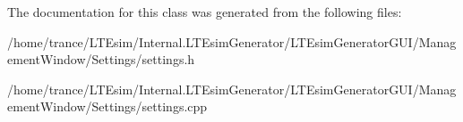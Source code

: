 The documentation for this class was generated from the following files\+:\begin{DoxyCompactItemize}
\item 
/home/trance/\+L\+T\+Esim/\+Internal.\+L\+T\+Esim\+Generator/\+L\+T\+Esim\+Generator\+G\+U\+I/\+Management\+Window/\+Settings/settings.\+h\item 
/home/trance/\+L\+T\+Esim/\+Internal.\+L\+T\+Esim\+Generator/\+L\+T\+Esim\+Generator\+G\+U\+I/\+Management\+Window/\+Settings/settings.\+cpp\end{DoxyCompactItemize}
